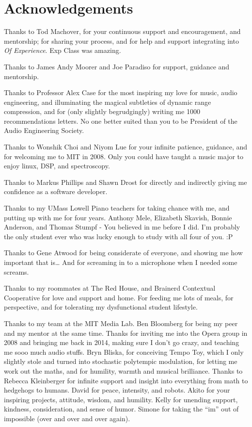 \chapter*{Acknowledgements}
\label{ch:acknowledgements}


\begin{fullwidth}

  Thanks to Tod Machover, for your continuous support and
  encouragement, and mentorship; for sharing your process, and for
  help and support integrating \thesis into \textit{Of
    Experience}. Exp Class was amazing.

Thanks to James Andy Moorer and Joe Paradiso for support, guidance
and mentorship.

Thanks to Professor Alex Case for the most inspiring my love for
music, audio engineering, and illuminating the magical subtleties of
dynamic range compression, and for (only slightly begrudgingly)
writing me 1000 recommendations letters. No one better suited than you
to be President of the Audio Engineering Society.

Thanks to Wonshik Choi and Niyom Lue for your infinite patience,
guidance, and for welcoming me to MIT in 2008. Only you could have
taught a music major to enjoy linux, DSP, and spectroscopy.

Thanks to Markus Phillips and Shawn Drost for directly and indirectly
giving me confidence as a software developer.

Thanks to my UMass Lowell Piano teachers for taking chance with me,
and putting up with me for four years. Anthony Mele, Elizabeth
Skavish, Bonnie Anderson, and Thomas Stumpf - You believed in me
before I did. I'm probably the only student ever who was lucky enough
to study with all four of you. :P

Thanks to Gene Atwood for being considerate of everyone, and showing
me how important that is\ldots{} And for screaming in to a microphone when
I needed some screams.

Thanks to my roommates at The Red House, and Brainerd Contextual
Cooperative for love and support and home. For feeding me lots of
meals, for perspective, and for tolerating my dysfunctional student
lifestyle.

Thanks to my team at the MIT Media Lab. Ben Bloomberg for being my peer
and my mentor at the same time. Thanks for inviting me into the Opera
group in 2008 and bringing me back in 2014, making sure I don't go
crazy, and teaching me sooo much audio stuffs. Bryn Bliska, for
conceiving Tempo Toy, which I only slightly stole and turned into
stochastic polytempic modulation, for letting me work out the maths,
and for humility, warmth and musical brilliance. Thanks to Rebecca
Kleinberger for infinite support and insight into everything from
math to hedgehogs to humans. David for peace, intensity, and
robots. Akito for your inspiring projects, attitude, wisdom, and
humility. Kelly for unending support, kindness, consideration, and
sense of humor. Simone for taking the ``im'' out of impossible (over
and over and over again).


\end{fullwidth}
